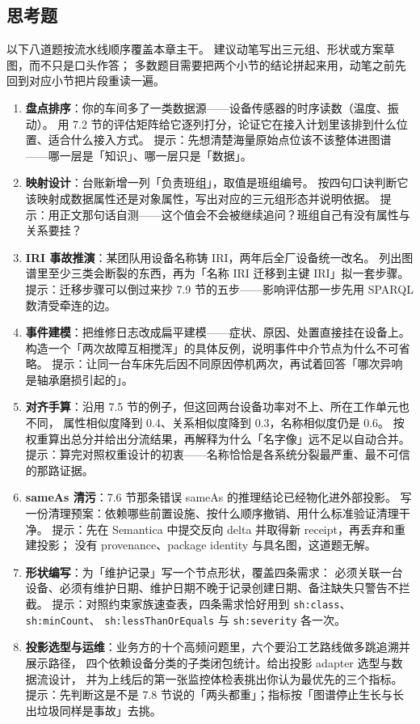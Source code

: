 \subsection{思考题}

以下八道题按流水线顺序覆盖本章主干。
建议动笔写出三元组、形状或方案草图，而不只是口头作答；
多数题目需要把两个小节的结论拼起来用，动笔之前先回到对应小节把片段重读一遍。

\begin{noteblock}
\begin{enumerate}
\item \textbf{盘点排序}：你的车间多了一类数据源——设备传感器的时序读数（温度、振动）。
  用 7.2 节的评估矩阵给它逐列打分，论证它在接入计划里该排到什么位置、适合什么接入方式。
  提示：先想清楚海量原始点位该不该整体进图谱——哪一层是「知识」、哪一层只是「数据」。
\item \textbf{映射设计}：台账新增一列「负责班组」，取值是班组编号。
  按四句口诀判断它该映射成数据属性还是对象属性，写出对应的三元组形态并说明依据。
  提示：用正文那句话自测——这个值会不会被继续追问？班组自己有没有属性与关系要挂？
\item \textbf{IRI 事故推演}：某团队用设备名称铸 IRI，两年后全厂设备统一改名。
  列出图谱里至少三类会断裂的东西，再为「名称 IRI 迁移到主键 IRI」拟一套步骤。
  提示：迁移步骤可以倒过来抄 7.9 节的五步——影响评估那一步先用 SPARQL 数清受牵连的边。
\item \textbf{事件建模}：把维修日志改成扁平建模——症状、原因、处置直接挂在设备上。
  构造一个「两次故障互相搅浑」的具体反例，说明事件中介节点为什么不可省略。
  提示：让同一台车床先后因不同原因停机两次，再试着回答「哪次异响是轴承磨损引起的」。
\item \textbf{对齐手算}：沿用 7.5 节的例子，但这回两台设备功率对不上、所在工作单元也不同，
  属性相似度降到 0.4、关系相似度降到 0.3，名称相似度仍是 0.6。
  按权重算出总分并给出分流结果，再解释为什么「名字像」远不足以自动合并。
  提示：算完对照权重设计的初衷——名称恰恰是各系统分裂最严重、最不可信的那路证据。
\item \textbf{sameAs 清污}：7.6 节那条错误 sameAs 的推理结论已经物化进外部投影。
  写一份清理预案：依赖哪些前置设施、按什么顺序撤销、用什么标准验证清理干净。
  提示：先在 Semantica 中提交反向 delta 并取得新 receipt，再丢弃和重建投影；
  没有 provenance、package identity 与具名图，这道题无解。
\item \textbf{形状编写}：为「维护记录」写一个节点形状，覆盖四条需求：
  必须关联一台设备、必须有维护日期、维护日期不晚于记录创建日期、备注缺失只警告不拦截。
  提示：对照约束家族速查表，四条需求恰好用到 \texttt{sh:class}、\texttt{sh:minCount}、
  \texttt{sh:lessThanOrEquals} 与 \texttt{sh:severity} 各一次。
\item \textbf{投影选型与运维}：业务方的十个高频问题里，六个要沿工艺路线做多跳追溯并展示路径，
  四个依赖设备分类的子类闭包统计。给出投影 adapter 选型与数据流设计，
  并为上线后的第一张监控体检表挑出你认为最优先的三个指标。
  提示：先判断这是不是 7.8 节说的「两头都重」；指标按「图谱停止生长与长出垃圾同样是事故」去挑。
\end{enumerate}
\end{noteblock}

